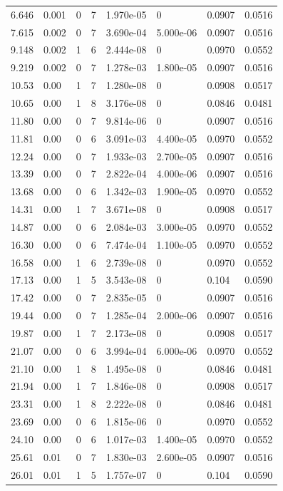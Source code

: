 \documentclass[preview]{standalone}
\begin{document}
{{\begin{tabular}{L{1.2cm}C{1.2cm} C{0.3cm}C{0.5cm} C{1.4cm}C{1.4cm} C{1.4cm}C{1.4cm}}
  6.646  &  0.001  & 0     &  7 &  1.970e-05  & 0  & 0.0907 &  0.0516   \\ 
  7.615  &  0.002  & 0     &  7 &  3.690e-04  & 5.000e-06  & 0.0907 &  0.0516   \\ 
  9.148  &  0.002  & 1     &  6 &  2.444e-08  & 0  & 0.0970 &  0.0552   \\ 
  9.219  &  0.002  & 0     &  7 &  1.278e-03  & 1.800e-05  & 0.0907 &  0.0516   \\ 
  10.53  &  0.00  & 1     &  7 &  1.280e-08  & 0  & 0.0908 &  0.0517   \\ 
  10.65  &  0.00  & 1     &  8 &  3.176e-08  & 0  & 0.0846 &  0.0481   \\ 
  11.80  &  0.00  & 0     &  7 &  9.814e-06  & 0  & 0.0907 &  0.0516   \\ 
  11.81  &  0.00  & 0     &  6 &  3.091e-03  & 4.400e-05  & 0.0970 &  0.0552   \\ 
  12.24  &  0.00  & 0     &  7 &  1.933e-03  & 2.700e-05  & 0.0907 &  0.0516   \\ 
  13.39  &  0.00  & 0     &  7 &  2.822e-04  & 4.000e-06  & 0.0907 &  0.0516   \\ 
  13.68  &  0.00  & 0     &  6 &  1.342e-03  & 1.900e-05  & 0.0970 &  0.0552   \\ 
  14.31  &  0.00  & 1     &  7 &  3.671e-08  & 0  & 0.0908 &  0.0517   \\ 
  14.87  &  0.00  & 0     &  6 &  2.084e-03  & 3.000e-05  & 0.0970 &  0.0552   \\ 
  16.30  &  0.00  & 0     &  6 &  7.474e-04  & 1.100e-05  & 0.0970 &  0.0552   \\ 
  16.58  &  0.00  & 1     &  6 &  2.739e-08  & 0  & 0.0970 &  0.0552   \\ 
  17.13  &  0.00  & 1     &  5 &  3.543e-08  & 0  & 0.104 &  0.0590   \\ 
  17.42  &  0.00  & 0     &  7 &  2.835e-05  & 0  & 0.0907 &  0.0516   \\ 
  19.44  &  0.00  & 0     &  7 &  1.285e-04  & 2.000e-06  & 0.0907 &  0.0516   \\ 
  19.87  &  0.00  & 1     &  7 &  2.173e-08  & 0  & 0.0908 &  0.0517   \\ 
  21.07  &  0.00  & 0     &  6 &  3.994e-04  & 6.000e-06  & 0.0970 &  0.0552   \\ 
  21.10  &  0.00  & 1     &  8 &  1.495e-08  & 0  & 0.0846 &  0.0481   \\ 
  21.94  &  0.00  & 1     &  7 &  1.846e-08  & 0  & 0.0908 &  0.0517   \\ 
  23.31  &  0.00  & 1     &  8 &  2.222e-08  & 0  & 0.0846 &  0.0481   \\ 
  23.69  &  0.00  & 0     &  6 &  1.815e-06  & 0  & 0.0970 &  0.0552   \\ 
  24.10  &  0.00  & 0     &  6 &  1.017e-03  & 1.400e-05  & 0.0970 &  0.0552   \\ 
  25.61  &  0.01  & 0     &  7 &  1.830e-03  & 2.600e-05  & 0.0907 &  0.0516   \\ 
  26.01  &  0.01  & 1     &  5 &  1.757e-07  & 0  & 0.104 &  0.0590   \\ 
\hline 
\end{tabular} 

}}
\end{document}
